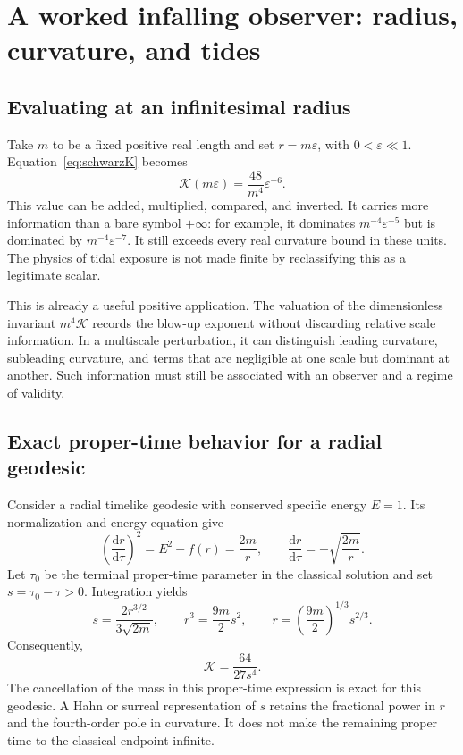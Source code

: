 \documentclass[11pt,a4paper]{article}
\numberwithin{equation}{section}
\theoremstyle{definition}
\theoremstyle{remark}
\newcommand{\eps}{\varepsilon}
\newcommand{\dd}{\mathrm d}
\newcommand{\Krets}{\mathcal K}
\begin{document}
\section{A worked infalling observer: radius, curvature, and tides}
\label{sec:infall}

\subsection{Evaluating at an infinitesimal radius}
Take $m$ to be a fixed positive real length and set $r=m\eps$, with $0<\eps\ll1$. Equation~\eqref{eq:schwarzK} becomes
\begin{equation}\label{eq:epsilonK}
 \Krets(m\eps)=\frac{48}{m^4}\eps^{-6}.
\end{equation}
This value can be added, multiplied, compared, and inverted. It carries more information than a bare symbol $+\infty$: for example, it dominates $m^{-4}\eps^{-5}$ but is dominated by $m^{-4}\eps^{-7}$. It still exceeds every real curvature bound in these units. The physics of tidal exposure is not made finite by reclassifying this as a legitimate scalar.

This is already a useful positive application. The valuation of the dimensionless invariant $m^4\Krets$ records the blow-up exponent without discarding relative scale information. In a multiscale perturbation, it can distinguish leading curvature, subleading curvature, and terms that are negligible at one scale but dominant at another. Such information must still be associated with an observer and a regime of validity.

\subsection{Exact proper-time behavior for a radial geodesic}
Consider a radial timelike geodesic with conserved specific energy $E=1$. Its normalization and energy equation give
\begin{equation}
 \left(\frac{\dd r}{\dd\tau}\right)^2=E^2-f(r)=\frac{2m}{r},
 \qquad \frac{\dd r}{\dd\tau}=-\sqrt{\frac{2m}{r}}.
\end{equation}
Let $\tau_0$ be the terminal proper-time parameter in the classical solution and set $s=\tau_0-\tau>0$. Integration yields
\begin{equation}\label{eq:infall}
 s=\frac{2r^{3/2}}{3\sqrt{2m}},\qquad
 r^3=\frac{9m}{2}s^2,\qquad
 r=\left(\frac{9m}{2}\right)^{1/3}s^{2/3}.
\end{equation}
Consequently,
\begin{equation}\label{eq:properK}
 \Krets=\frac{64}{27s^4}.
\end{equation}
The cancellation of the mass in this proper-time expression is exact for this geodesic. A Hahn or surreal representation of $s$ retains the fractional power in $r$ and the fourth-order pole in curvature. It does not make the remaining proper time to the classical endpoint infinite.
\end{document}
